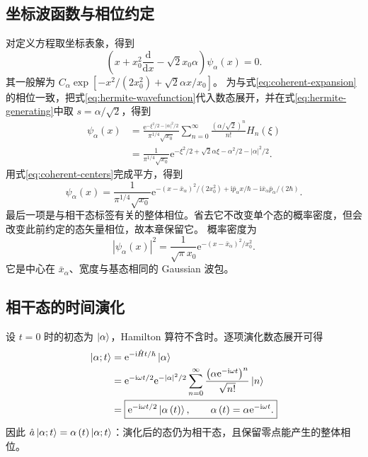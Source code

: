 \subsection{坐标波函数与相位约定}
对定义方程取坐标表象，得到
\begin{equation}
\left(x+x_0^2\frac{\mathrm{d}}{\mathrm{d}x}-\sqrt2x_0\alpha\right)\psi_\alpha\left(x\right)=0.
\end{equation}
其一般解为 $C_\alpha\exp\left[-x^2/\left(2x_0^2\right)+\sqrt2\alpha x/x_0\right]$。
为与式\eqref{eq:coherent-expansion}的相位一致，把式\eqref{eq:hermite-wavefunction}代入数态展开，并在式\eqref{eq:hermite-generating}中取 $s=\alpha/\sqrt2$，得到
\begin{align}
\psi_\alpha\left(x\right)
&=\frac{\mathrm{e}^{-\xi^2/2-\left|\alpha\right|^2/2}}{\pi^{1/4}\sqrt{x_0}}
\sum_{n=0}^{\infty}\frac{\left(\alpha/\sqrt2\right)^n}{n!}H_n\left(\xi\right)\\
&=\frac{1}{\pi^{1/4}\sqrt{x_0}}
\mathrm{e}^{-\xi^2/2+\sqrt2\alpha\xi-\alpha^2/2-\left|\alpha\right|^2/2}.
\end{align}
用式\eqref{eq:coherent-centers}完成平方，得到
\begin{equation}
\boxed{\psi_\alpha\left(x\right)=\frac{1}{\pi^{1/4}\sqrt{x_0}}
\mathrm{e}^{-\left(x-\bar x_\alpha\right)^2/\left(2x_0^2\right)
+\mathrm{i}\bar p_\alpha x/\hbar-\mathrm{i}\bar x_\alpha\bar p_\alpha/\left(2\hbar\right)}.}
\label{eq:coherent-wavefunction}
\end{equation}
最后一项是与相干态标签有关的整体相位。省去它不改变单个态的概率密度，但会改变此前约定的态矢量相位，故本章保留它。
概率密度为
\begin{equation}
\left|\psi_\alpha\left(x\right)\right|^2=\frac{1}{\sqrt\pi x_0}
\mathrm{e}^{-\left(x-\bar x_\alpha\right)^2/x_0^2}.
\end{equation}
它是中心在 $\bar x_\alpha$、宽度与基态相同的 Gaussian 波包。

\subsection{相干态的时间演化}
设 $t=0$ 时的初态为 $\Ket{\alpha}$，Hamilton 算符不含时。逐项演化数态展开可得
\begin{align}
\Ket{\alpha;t}
&=\mathrm{e}^{-\mathrm{i}\hat Ht/\hbar}\Ket{\alpha}\\
&=\mathrm{e}^{-\mathrm{i}\omega t/2}\mathrm{e}^{-\left|\alpha\right|^2/2}
\sum_{n=0}^{\infty}\frac{\left(\alpha\mathrm{e}^{-\mathrm{i}\omega t}\right)^n}{\sqrt{n!}}\Ket{n}\\
&=\boxed{\mathrm{e}^{-\mathrm{i}\omega t/2}\Ket{\alpha\left(t\right)},\qquad
\alpha\left(t\right)=\alpha\mathrm{e}^{-\mathrm{i}\omega t}.}
\label{eq:coherent-time}
\end{align}
因此 $\hat a\Ket{\alpha;t}=\alpha\left(t\right)\Ket{\alpha;t}$：演化后的态仍为相干态，且保留零点能产生的整体相位。

